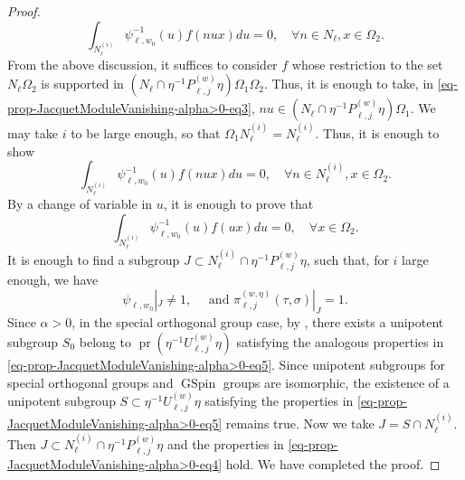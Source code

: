\documentclass[12pt]{amsart}
\theoremstyle{remark}
\newcommand{\pr}{\operatorname{pr}}
\DeclareMathOperator{\GSpin}{GSpin}
\begin{document}
\begin{proof}
\begin{equation}
\int_{N_{\ell}^{(i)}} \psi_{\ell,w_0}^{-1}(u)f( n u x) du=0, \quad \forall n\in N_{\ell}, x\in \Omega_2. 
\end{equation}
From the above discussion, it suffices to consider $f$ whose restriction to the set $N_{\ell}\Omega_2$ is supported in $(N_{\ell}\cap \eta^{-1} P_{\ell,j}^{(w)}\eta)\Omega_1 \Omega_2$. Thus, it is enough to take, in \eqref{eq-prop-JacquetModuleVanishing-alpha>0-eq3}, $nu\in (N_{\ell}\cap \eta^{-1} P_{\ell,j}^{(w)}\eta)\Omega_1$. We may take $i$ to be large enough, so that $\Omega_1 N_{\ell}^{(i)}=N_{\ell}^{(i)}$. Thus, it is enough to show
\begin{equation*}
\int_{N_{\ell}^{(i)}} \psi_{\ell,w_0}^{-1}(u)f( n u x) du=0, \quad \forall n\in N_{\ell}^{(i)}, x\in \Omega_2. 
\end{equation*}
By a change of variable in $u$, it is enough to prove that 
\begin{equation}
\label{eq-prop-JacquetModuleVanishing-alpha>0-eq4}
\int_{N_{\ell}^{(i)}} \psi_{\ell,w_0}^{-1}(u)f(  u x) du=0, \quad \forall  x\in \Omega_2. 
\end{equation}
It is enough to find a subgroup $J\subset N_{\ell}^{(i)}\cap \eta^{-1}P_{\ell, j}^{(w)}\eta$, such that, for $i$ large enough, we have
\begin{equation}
\label{eq-prop-JacquetModuleVanishing-alpha>0-eq5}
\psi_{\ell,w_0}|_J\not=1, \quad \text{ and }  	\pi_{\ell,j}^{(w,\eta)}(\tau,\sigma)|_J=1.
\end{equation}
Since $\alpha>0$, in the special orthogonal group case, by \cite[Proposition 5.1]{GinzburgRallisSoudry2011}, there exists a unipotent subgroup $S_0$ belong to $\pr(\eta^{-1} U_{\ell, j}^{(w)} \eta) $ satisfying the analogous properties in \eqref{eq-prop-JacquetModuleVanishing-alpha>0-eq5}. Since unipotent subgroups for special orthogonal groups and $\GSpin$ groups are isomorphic, the existence of a unipotent subgroup $S\subset \eta^{-1} U_{\ell, j}^{(w)} \eta$ satisfying the properties in \eqref{eq-prop-JacquetModuleVanishing-alpha>0-eq5} remains true. Now we take $J=S\cap N_{\ell}^{(i)}$. Then $J\subset N_{\ell}^{(i)}\cap \eta^{-1}P_{\ell, j}^{(w)}\eta$ and the properties in \eqref{eq-prop-JacquetModuleVanishing-alpha>0-eq4} hold. We have completed the proof. 
\end{proof}
\end{document}
